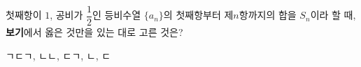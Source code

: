 첫째항이 $1$, 공비가 $\dfrac{1}{2}$인 등비수열 $\{a_n\}$의 첫째항부터 제$n$항까지의 합을 $S_n$이라 할 때, \textbf{보기}에서 옳은 것만을 있는 대로 고른 것은? 
\begin{choices32}{ㄱ}{ㄷ}{ㄱ, ㄴ}{ㄴ, ㄷ}{ㄱ, ㄴ, ㄷ}\end{choices32}

